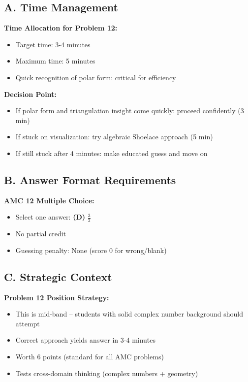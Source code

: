 \documentclass[12pt]{article}
\begin{document}
\begin{competitionbox}
\subsection*{A. Time Management}

\textbf{Time Allocation for Problem 12:}
\begin{itemize}
    \item Target time: 3-4 minutes
    \item Maximum time: 5 minutes
    \item Quick recognition of polar form: critical for efficiency
\end{itemize}

\textbf{Decision Point:}
\begin{itemize}
    \item If polar form and triangulation insight come quickly: proceed confidently (3 min)
    \item If stuck on visualization: try algebraic Shoelace approach (5 min)
    \item If still stuck after 4 minutes: make educated guess and move on
\end{itemize}

\subsection*{B. Answer Format Requirements}

\textbf{AMC 12 Multiple Choice:}
\begin{itemize}
    \item Select one answer: \textbf{(D)} $\frac{3}{2}$
    \item No partial credit
    \item Guessing penalty: None (score 0 for wrong/blank)
\end{itemize}

\subsection*{C. Strategic Context}

\textbf{Problem 12 Position Strategy:}
\begin{itemize}
    \item This is mid-band -- students with solid complex number background should attempt
    \item Correct approach yields answer in 3-4 minutes
    \item Worth 6 points (standard for all AMC problems)
    \item Tests cross-domain thinking (complex numbers + geometry)
\end{itemize}


\end{competitionbox}
\end{document}
